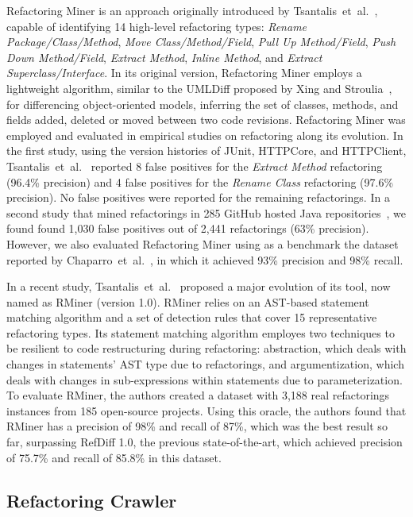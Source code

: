 \documentclass[10pt,journal,compsoc]{IEEEtran}
\begin{document}
Refactoring Miner is an approach originally introduced by Tsantalis~et~al.~\cite{tsantalis_empiricalstudy}, capable of identifying 14 high-level refactoring types: \emph{Rename Package/Class/Method}, \emph{Move Class/Method/Field}, \emph{Pull Up Method/Field}, \emph{Push Down Method/Field}, \emph{Extract Method}, \emph{Inline Method}, and \emph{Extract Superclass/Interface}.
In its original version, Refactoring Miner employs a lightweight algorithm, similar to the UMLDiff proposed by Xing and Stroulia~\cite{Xing:2005}, for differencing object-oriented models, inferring the set of classes, methods, and fields added, deleted or moved between two code revisions. 
Refactoring Miner was employed and evaluated in empirical studies on refactoring along its evolution.
In the first study, using the version histories of JUnit, HTTPCore, and HTTPClient, Tsantalis~et~al.~\cite{tsantalis_empiricalstudy} reported 8 false positives for the \emph{Extract Method} refactoring (96.4\% precision) and 4 false positives for the \emph{Rename Class} refactoring (97.6\% precision). No false positives were reported for the remaining refactorings.
In a second study that mined refactorings in 285 GitHub hosted Java repositories~\cite{fse2016-why-we-refactor}, we found found 1,030 false positives out of 2,441 refactorings (63\% precision). However, we also evaluated Refactoring Miner using as a benchmark the dataset reported by Chaparro~et~al.~\cite{Chaparro:2014}, in which it achieved 93\% precision and 98\% recall.

In a recent study, Tsantalis~et~al.~\cite{tsantalis2018rminer} proposed a major evolution of its tool, now named as RMiner (version 1.0).
RMiner relies on an AST-based statement matching algorithm and a set of detection rules that cover 15 representative refactoring types. 
Its statement matching algorithm employes two techniques to be resilient to code restructuring during refactoring: abstraction, which deals with changes in statements' AST type due to refactorings, and argumentization, which deals with changes in sub-expressions within statements due to parameterization.
To evaluate RMiner, the authors created a dataset with 3,188 real refactorings instances from 185 open-source projects. Using this oracle, the authors found that RMiner has a precision of 98\% and recall of 87\%, which was the best result so far, surpassing RefDiff 1.0, the previous state-of-the-art, which achieved precision of 75.7\% and recall of 85.8\% in this dataset.


\subsection{Refactoring Crawler}
\end{document}
